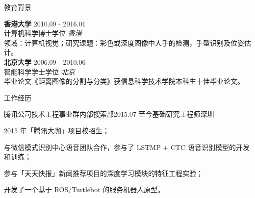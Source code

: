 \documentclass{cv_professional-cn} %
\begin{document}

\begin{rSection}{教育背景}

{\bf 香港大学} \hfill 2010.09 - 2016.01 \\ 
计算机科学博士学位 \hfill {\em 香港}\smallskip \vspace{-0.25em}\\
领域：计算机视觉；研究课题：彩色或深度图像中人手的检测，手型识别及位姿估计。\hfill \smallskip \\
{\bf 北京大学} \hfill 2006.09 - 2010.06 \\ 
智能科学学士学位 \hfill {\em 北京} \smallskip \vspace{-0.25em}\\
毕业论文《距离图像的分割与分类》获信息科学技术学院本科生十佳毕业论文。 \hfill

\end{rSection}



\begin{rSection}{工作经历}
	
\begin{rSubsection}{腾讯公司技术工程事业群内部搜索部}{2015.07 至今}{基础研究工程师}{深圳}
	\item 2015 年「腾讯大咖」项目校招生；
	\item 与微信模式识别中心语音团队合作，参与了 LSTMP + CTC 语音识别模型的开发和训练；
	\item 参与「天天快报」新闻推荐项目的深度学习模块的特征工程实验；
	\item 开发了一个基于 ROS/Turtlebot 的服务机器人原型。
\end{rSubsection}
	
\end{rSection}

\end{document}
